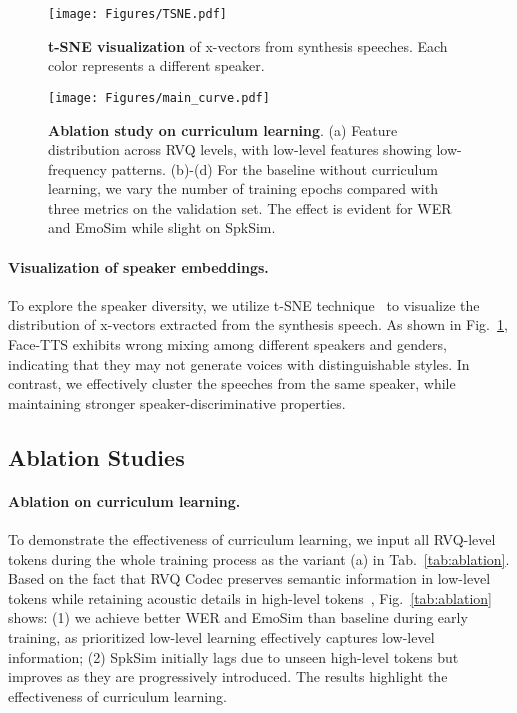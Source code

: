 \begin{figure}[htbp]
    \centering
    \texttt{[image: Figures/TSNE.pdf]}
    \caption{\textbf{t-SNE visualization} of x-vectors from synthesis speeches. Each color represents a different speaker.}
    \label{fig:xvector-TSNE}
\end{figure}

\begin{figure*}[t]
    \centering
    \texttt{[image: Figures/main\_curve.pdf]}
    \caption{\textbf{Ablation study on curriculum learning}. (a) Feature distribution across RVQ levels, with low-level features showing low-frequency patterns. (b)-(d) For the baseline without curriculum learning, we vary the number of training epochs compared with three metrics on the validation set. The effect is evident for WER and EmoSim while slight on SpkSim.}
    \label{fig:CL}
\end{figure*}

\paragraph{Visualization of speaker embeddings.~~\xspace}
To explore the speaker diversity, we utilize t-SNE technique~\cite{T-SNE} to visualize the distribution of x-vectors extracted from the synthesis speech. 
As shown in Fig.~\ref{fig:xvector-TSNE}, Face-TTS exhibits wrong mixing among different speakers and genders, indicating that they may not generate voices with distinguishable styles. 
In contrast, we effectively cluster the speeches from the same speaker, while maintaining stronger speaker-discriminative properties.


\subsection{Ablation Studies}

\paragraph{Ablation on curriculum learning.~~\xspace} 
To demonstrate the effectiveness of curriculum learning, we input all RVQ-level tokens during the whole training process as the variant (a) in Tab.~\ref{tab:ablation}. 
Based on the fact that RVQ Codec preserves semantic information in low-level tokens while retaining acoustic details in high-level tokens~\cite{rvq_level:journals/corr/abs-2410-04380}, Fig.~\ref{tab:ablation} shows:
(1) we achieve better WER and EmoSim than baseline during early training, as prioritized low-level learning effectively captures low-level information; 
(2) SpkSim initially lags due to unseen high-level tokens but improves as they are progressively introduced. 
The results highlight the effectiveness of curriculum learning. 

